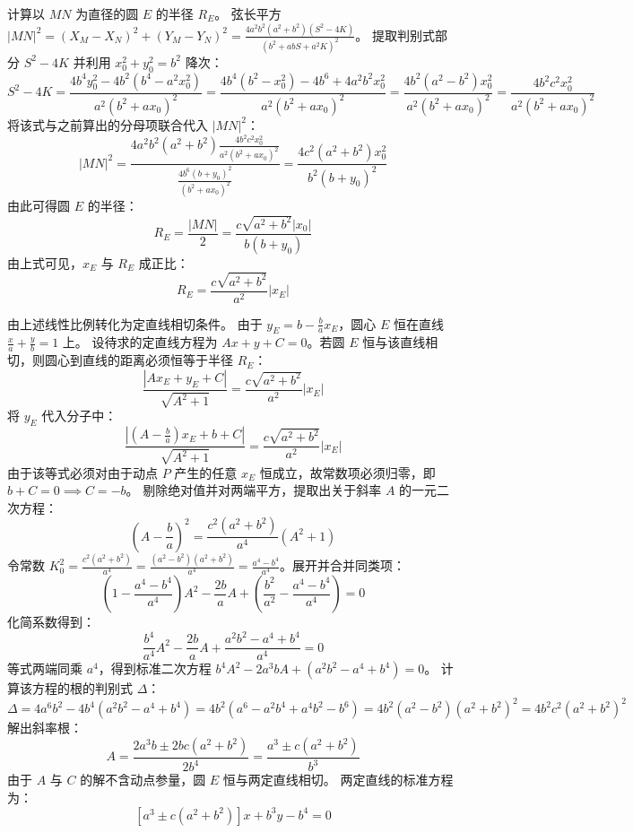 \begin{solution}
计算以 $MN$ 为直径的圆 $E$ 的半径 $R_E$。
弦长平方 $|MN|^2 = (X_M - X_N)^2 + (Y_M - Y_N)^2 = \frac{4a^2 b^2 (a^2+b^2) (S^2 - 4K)}{(b^2 + abS + a^2 K)^2}$。
提取判别式部分 $S^2 - 4K$ 并利用 $x_0^2 + y_0^2 = b^2$ 降次：
$$ S^2 - 4K = \frac{4b^4 y_0^2 - 4b^2(b^4 - a^2 x_0^2)}{a^2(b^2 + a x_0)^2} = \frac{4b^4(b^2 - x_0^2) - 4b^6 + 4a^2 b^2 x_0^2}{a^2(b^2 + a x_0)^2} = \frac{4b^2(a^2 - b^2)x_0^2}{a^2(b^2 + a x_0)^2} = \frac{4b^2 c^2 x_0^2}{a^2(b^2 + a x_0)^2} $$
将该式与之前算出的分母项联合代入 $|MN|^2$：
$$ |MN|^2 = \frac{4a^2 b^2 (a^2+b^2) \frac{4b^2 c^2 x_0^2}{a^2(b^2 + a x_0)^2}}{\frac{4b^6(b + y_0)^2}{(b^2 + a x_0)^2}} = \frac{4c^2(a^2+b^2)x_0^2}{b^2(b + y_0)^2} $$
由此可得圆 $E$ 的半径：
$$ R_E = \frac{|MN|}{2} = \frac{c\sqrt{a^2+b^2}|x_0|}{b(b + y_0)} $$
由上式可见，$x_E$ 与 $R_E$ 成正比：
$$ R_E = \frac{c\sqrt{a^2+b^2}}{a^2} |x_E| $$

由上述线性比例转化为定直线相切条件。
由于 $y_E = b - \frac{b}{a} x_E$，圆心 $E$ 恒在直线 $\frac{x}{a} + \frac{y}{b} = 1$ 上。
设待求的定直线方程为 $A x + y + C = 0$。若圆 $E$ 恒与该直线相切，则圆心到直线的距离必须恒等于半径 $R_E$：
$$ \frac{|A x_E + y_E + C|}{\sqrt{A^2+1}} = \frac{c\sqrt{a^2+b^2}}{a^2} |x_E| $$
将 $y_E$ 代入分子中：
$$ \frac{|(A - \frac{b}{a}) x_E + b + C|}{\sqrt{A^2+1}} = \frac{c\sqrt{a^2+b^2}}{a^2} |x_E| $$
由于该等式必须对由于动点 $P$ 产生的任意 $x_E$ 恒成立，故常数项必须归零，即 $b + C = 0 \implies C = -b$。
剔除绝对值并对两端平方，提取出关于斜率 $A$ 的一元二次方程：
$$ \left( A - \frac{b}{a} \right)^2 = \frac{c^2(a^2+b^2)}{a^4} (A^2 + 1) $$
令常数 $K_0^2 = \frac{c^2(a^2+b^2)}{a^4} = \frac{(a^2-b^2)(a^2+b^2)}{a^4} = \frac{a^4-b^4}{a^4}$。展开并合并同类项：
$$ \left( 1 - \frac{a^4-b^4}{a^4} \right) A^2 - \frac{2b}{a} A + \left( \frac{b^2}{a^2} - \frac{a^4-b^4}{a^4} \right) = 0 $$
化简系数得到：
$$ \frac{b^4}{a^4} A^2 - \frac{2b}{a} A + \frac{a^2 b^2 - a^4 + b^4}{a^4} = 0 $$
等式两端同乘 $a^4$，得到标准二次方程 $b^4 A^2 - 2a^3 b A + (a^2 b^2 - a^4 + b^4) = 0$。
计算该方程的根的判别式 $\Delta$：
$$ \Delta = 4a^6 b^2 - 4b^4(a^2 b^2 - a^4 + b^4) = 4b^2(a^6 - a^2 b^4 + a^4 b^2 - b^6) = 4b^2(a^2-b^2)(a^2+b^2)^2 = 4b^2 c^2(a^2+b^2)^2 $$
解出斜率根：
$$ A = \frac{2a^3 b \pm 2bc(a^2+b^2)}{2b^4} = \frac{a^3 \pm c(a^2+b^2)}{b^3} $$
由于 $A$ 与 $C$ 的解不含动点参量，圆 $E$ 恒与两定直线相切。
两定直线的标准方程为：
$$ [a^3 \pm c(a^2+b^2)]x + b^3 y - b^4 = 0 $$
\end{solution}

